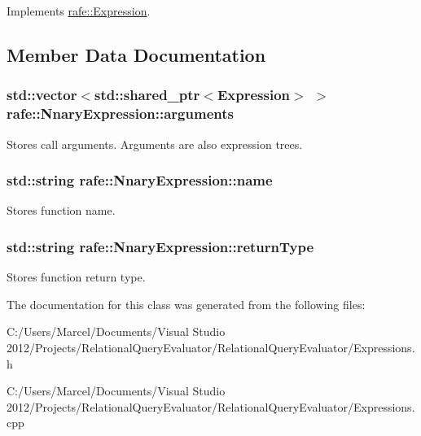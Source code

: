 Implements \hyperlink{classrafe_1_1_expression_a841879e8eb85f4bb68cfeec24231a701}{rafe\+::\+Expression}.



\subsection{Member Data Documentation}
\hypertarget{classrafe_1_1_nnary_expression_af78598eb1a4c75a90204a85aa2292313}{
\subsubsection[{arguments}]{\setlength{\rightskip}{0pt plus 5cm}std\+::vector$<$std\+::shared\+\_\+ptr$<${\bf Expression}$>$ $>$ rafe\+::\+Nnary\+Expression\+::arguments}}\label{classrafe_1_1_nnary_expression_af78598eb1a4c75a90204a85aa2292313}
Stores call arguments. Arguments are also expression trees. \hypertarget{classrafe_1_1_nnary_expression_a14fbf6f0dd20a40e6ea647a1223e5362}{
\subsubsection[{name}]{\setlength{\rightskip}{0pt plus 5cm}std\+::string rafe\+::\+Nnary\+Expression\+::name}}\label{classrafe_1_1_nnary_expression_a14fbf6f0dd20a40e6ea647a1223e5362}
Stores function name. \hypertarget{classrafe_1_1_nnary_expression_a220fa9d75003ecbadc3c3b365e5c8603}{
\subsubsection[{return\+Type}]{\setlength{\rightskip}{0pt plus 5cm}std\+::string rafe\+::\+Nnary\+Expression\+::return\+Type}}\label{classrafe_1_1_nnary_expression_a220fa9d75003ecbadc3c3b365e5c8603}
Stores function return type. 

The documentation for this class was generated from the following files\+:\begin{DoxyCompactItemize}
\item 
C\+:/\+Users/\+Marcel/\+Documents/\+Visual Studio 2012/\+Projects/\+Relational\+Query\+Evaluator/\+Relational\+Query\+Evaluator/Expressions.\+h\item 
C\+:/\+Users/\+Marcel/\+Documents/\+Visual Studio 2012/\+Projects/\+Relational\+Query\+Evaluator/\+Relational\+Query\+Evaluator/Expressions.\+cpp\end{DoxyCompactItemize}
